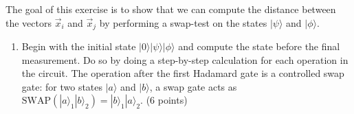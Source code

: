 \documentclass[12pt]{article}
\begin{document}
    The goal of this exercise is to show that we can compute the distance between the vectors $\vec{x}_i$ and $\vec{x}_j$ by performing a swap-test on the states $|\psi\rangle$ and $|\phi\rangle$.



    \begin{enumerate}[start=3]
        \item Begin with the initial state $|0\rangle|\psi\rangle|\phi\rangle$ and compute the state before the final measurement. Do so by doing a step-by-step calculation for each operation in the circuit. The operation after the first Hadamard gate is a controlled swap gate: for two states $|a\rangle$ and $|b\rangle$, a swap gate acts as $\text{SWAP}(|a\rangle_1|b\rangle_2) = |b\rangle_1|a\rangle_2$. (6 points)
    \end{enumerate}
\end{document}
